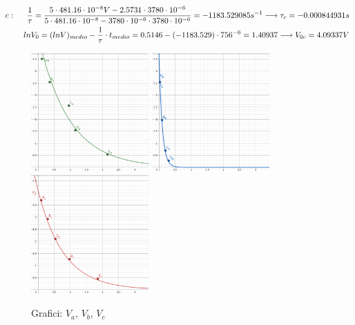 \begin{center}
\begin{equation}
\begin{split}
        \end{split}
    \end{equation}
    \begin{equation}
        \begin{split}
            c : \hspace{0.5 cm}\frac{1}{\tau} = \frac{5 \cdot 481.16\cdot10^{-8}V - 2.5731\cdot3780\cdot10^{-6}}{5\cdot481.16\cdot10^{-8} - 3780\cdot10^{-6}\cdot3780\cdot10^{-6}}
            = -1183.529085s^{-1} \longrightarrow \tau_c = -0.000844931s
            \\
            ln{V_0} = (ln{V})_{medio} - \frac{1}{\tau}\cdot t_{medio} = 0.5146 - (-1183.529)\cdot756^{-6} = 1.40937 \longrightarrow V_{0c} = 4.09337V
        \end{split}
    \end{equation}
    \end{center}

    \begin{figure}[!h]
        \begin{center}
            \includegraphics[width = 4.5cm]{Agraph.png}
            \includegraphics[width = 4.5cm]{Bgraph.png}
            \includegraphics[width = 4.5cm]{Cgraph.png}
            \caption{Grafici: \color{green}$V_a$, \color{blue}$V_b$, \color{red}$V_c$}
        \end{center}
    \end{figure}

